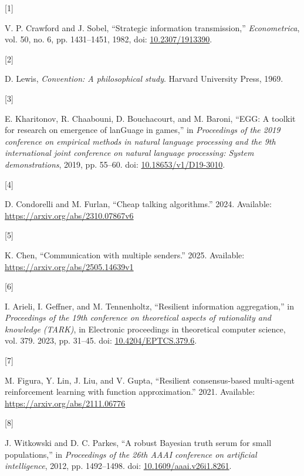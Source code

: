 \documentclass[
  12pt,
]{article}
\newlength{\cslhangindent}
\newlength{\csllabelwidth}
\newenvironment{CSLReferences}[2] %
 {\begin{list}{}{%
  \setlength{\itemindent}{0pt}
  \setlength{\leftmargin}{0pt}
  \setlength{\parsep}{0pt}
  \ifodd #1
   \setlength{\leftmargin}{\cslhangindent}
   \setlength{\itemindent}{-1\cslhangindent}
  \fi
  \setlength{\itemsep}{#2\baselineskip}}}
 {\end{list}}
\newcommand{\CSLLeftMargin}[1]{\parbox[t]{\csllabelwidth}{\strut#1\strut}}
\newcommand{\CSLRightInline}[1]{\parbox[t]{\linewidth - \csllabelwidth}{\strut#1\strut}}
\begin{document}
\protect{}\label{refs}
\begin{CSLReferences}{0}{0}
\CSLLeftMargin{{[}1{]} }%
\CSLRightInline{V. P. Crawford and J. Sobel, {``Strategic information
transmission,''} \emph{Econometrica}, vol. 50, no. 6, pp. 1431--1451,
1982, doi: \href{https://doi.org/10.2307/1913390}{10.2307/1913390}.}

\CSLLeftMargin{{[}2{]} }%
\CSLRightInline{D. Lewis, \emph{Convention: A philosophical study}.
Harvard University Press, 1969.}

\CSLLeftMargin{{[}3{]} }%
\CSLRightInline{E. Kharitonov, R. Chaabouni, D. Bouchacourt, and M.
Baroni, {``{EGG}: A toolkit for research on emergence of lanGuage in
games,''} in \emph{Proceedings of the 2019 conference on empirical
methods in natural language processing and the 9th international joint
conference on natural language processing: System demonstrations}, 2019,
pp. 55--60. doi:
\href{https://doi.org/10.18653/v1/D19-3010}{10.18653/v1/D19-3010}.}

\CSLLeftMargin{{[}4{]} }%
\CSLRightInline{D. Condorelli and M. Furlan, {``Cheap talking
algorithms.''} 2024. Available:
\url{https://arxiv.org/abs/2310.07867v6}}

\CSLLeftMargin{{[}5{]} }%
\CSLRightInline{K. Chen, {``Communication with multiple senders.''}
2025. Available: \url{https://arxiv.org/abs/2505.14639v1}}

\CSLLeftMargin{{[}6{]} }%
\CSLRightInline{I. Arieli, I. Geffner, and M. Tennenholtz, {``Resilient
information aggregation,''} in \emph{Proceedings of the 19th conference
on theoretical aspects of rationality and knowledge (TARK)}, in
Electronic proceedings in theoretical computer science, vol. 379. 2023,
pp. 31--45. doi:
\href{https://doi.org/10.4204/EPTCS.379.6}{10.4204/EPTCS.379.6}.}

\CSLLeftMargin{{[}7{]} }%
\CSLRightInline{M. Figura, Y. Lin, J. Liu, and V. Gupta, {``Resilient
consensus-based multi-agent reinforcement learning with function
approximation.''} 2021. Available:
\url{https://arxiv.org/abs/2111.06776}}

\CSLLeftMargin{{[}8{]} }%
\CSLRightInline{J. Witkowski and D. C. Parkes, {``A robust {B}ayesian
truth serum for small populations,''} in \emph{Proceedings of the 26th
AAAI conference on artificial intelligence}, 2012, pp. 1492--1498. doi:
\href{https://doi.org/10.1609/aaai.v26i1.8261}{10.1609/aaai.v26i1.8261}.}


\end{CSLReferences}
\end{document}
